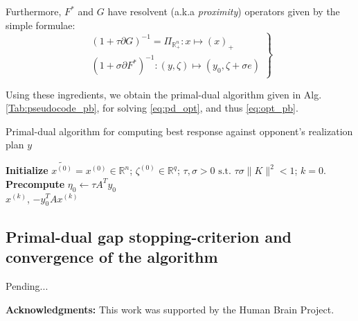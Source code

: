 \documentclass[a4paper,10pt,journal]{IEEEtran}
\begin{document}
Furthermore, $F^*$ and $G$ have resolvent (a.k.a \textit{proximity}) operators given by the simple formulae:
\begin{equation}
  \left.
  \begin{aligned}
    (1 + \tau \partial G)^{-1} = \Pi_{\mathbb{R}_+^n}: x \mapsto (x)_+\\
    (1 + \sigma \partial F^*)^{-1}: (y, \zeta) \mapsto (y_0, \zeta + \sigma e)
  \end{aligned}
  \right\}
\end{equation}

Using these ingredients, we obtain the primal-dual algorithm given in Alg.\ref{Tab:pseudocode_pb}, 
for solving \eqref{eq:pd_opt}, and thus \eqref{eq:opt_pb}.

\begin{algorithm}[htb]
\caption{Primal-dual algorithm for computing best response against opponent's realization plan $y$}%
\textbf{Initialize} $\tilde{x^{(0)}} = x^{(0)} \in \mathbb{R}^n$; $\zeta^{(0)} \in \mathbb{R}^{q}$;
$\tau, \sigma > 0 \text{ s.t. }\tau\sigma \|K\|^2 < 1$; $k = 0$.\\
\textbf{Precompute} $\eta_0 \leftarrow \tau A^Ty_0$\\
 \Return $x^{(k)}$, $-y_0^TAx^{(k)}$
\label{Tab:pseudocode_pb}
\end{algorithm}

\subsection{Primal-dual gap stopping-criterion and convergence of the algorithm}
Pending...

\medskip \noindent
\textbf{Acknowledgments:}
This work was supported by the  Human Brain Project.

 
\end{document}
